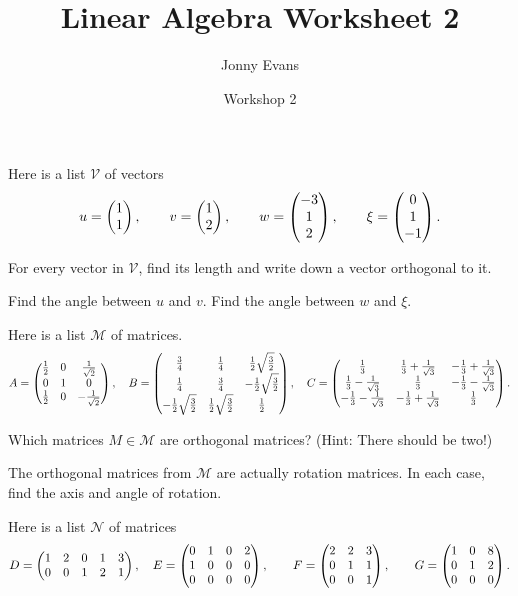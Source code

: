 \documentclass{article}
\title{Linear Algebra Worksheet 2}
\author{Jonny Evans}
\date{Workshop 2}
\begin{document}
\maketitle
\setcounter{section}{2}


Here is a list \(\mathcal{V}\) of vectors \[u=\begin{pmatrix} 1 \\ 1 \end{pmatrix},\qquad
v=\begin{pmatrix} 1 \\ 2\end{pmatrix},\qquad w=\begin{pmatrix} -3 \\ 1 \\ 2\end{pmatrix},\qquad \xi=\begin{pmatrix} 0 \\ 1
\\ -1\end{pmatrix}.\]


\begin{Exercise}\label{exr:orth}
For every vector in \(\mathcal{V}\), find its length and write down
a vector orthogonal to it.


\end{Exercise}
\begin{Exercise}\label{ex:dotprods}
Find the angle between \(u\) and \(v\). Find the angle between \(w\)
and \(\xi\).


\end{Exercise}
Here is a list \(\mathcal{M}\) of matrices. \[A=\begin{pmatrix} \frac{1}{2} & 0 &
\frac{1}{\sqrt{2}} \\ 0 & 1 & 0 \\ \frac{1}{2} & 0 &
-\frac{1}{\sqrt{2}}\end{pmatrix},\quad B=\begin{pmatrix} \frac{3}{4} & \frac{1}{4} &
\frac{1}{2}\sqrt{\frac{3}{2}} \\ \frac{1}{4} & \frac{3}{4} &
-\frac{1}{2}\sqrt{\frac{3}{2}} \\ -\frac{1}{2}\sqrt{\frac{3}{2}} &
\frac{1}{2}\sqrt{\frac{3}{2}} & \frac{1}{2} \end{pmatrix},\quad C=\begin{pmatrix}
\frac{1}{3} & \frac{1}{3}+\frac{1}{\sqrt{3}} &
-\frac{1}{3}+\frac{1}{\sqrt{3}} \\ \frac{1}{3}-\frac{1}{\sqrt{3}} &
\frac{1}{3} &
-\frac{1}{3}-\frac{1}{\sqrt{3}}\\ -\frac{1}{3}-\frac{1}{\sqrt{3}} &
-\frac{1}{3}+\frac{1}{\sqrt{3}} & \frac{1}{3} \end{pmatrix}.\]


\begin{Exercise}\label{exr:orthogmat}
Which matrices \(M\in\mathcal{M}\) are orthogonal matrices? (Hint:
There should be two!)


\end{Exercise}
\begin{Exercise}\label{exr:3drot}
The orthogonal matrices from \(\mathcal{M}\) are actually rotation
matrices. In each case, find the axis and angle of rotation.


\end{Exercise}
Here is a list \(\mathcal{N}\) of matrices
\[D=\begin{pmatrix} 1 & 2 & 0 & 1 & 3 \\ 0 & 0 & 1 & 2 & 1\end{pmatrix},\quad E=\begin{pmatrix} 0 & 1 & 0
& 2 \\ 1 & 0 & 0 & 0 \\ 0 & 0 & 0 & 0\end{pmatrix},\qquad F=\begin{pmatrix} 2 & 2 & 3 \\ 0 & 1
& 1 \\ 0 & 0 & 1\end{pmatrix},\qquad G=\begin{pmatrix} 1 & 0 & 8 \\ 0 & 1 & 2 \\ 0 & 0 & 0\end{pmatrix}.\]
\end{document}
